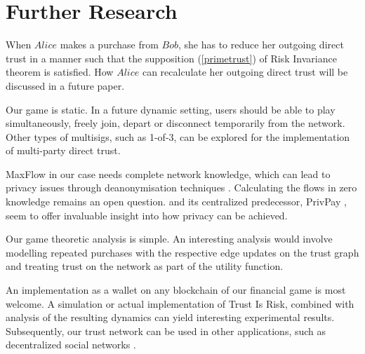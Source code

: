 \section{Further Research}

    When $Alice$ makes a purchase from $Bob$, she has to reduce her outgoing direct trust in a manner such that the
    supposition (\ref{primetrust}) of Risk Invariance theorem is satisfied. How $Alice$ can recalculate her outgoing
    direct trust will be discussed in a future paper.

    Our game is static. In a future dynamic setting, users should be able to play simultaneously, freely join, depart or
    disconnect temporarily from the network. Other types of multisigs, such as 1-of-3, can be explored for the
    implementation of multi-party direct trust.

    MaxFlow in our case needs complete network knowledge, which can lead to privacy issues through deanonymisation
    techniques \cite{deanonymisation}. Calculating the flows in zero knowledge remains an open question.
    \cite{silentwhispers} and its centralized predecessor, PrivPay \cite{privpay}, seem to offer invaluable insight into how
    privacy can be achieved.

    Our game theoretic analysis is simple. An interesting analysis would involve modelling repeated purchases with the
    respective edge updates on the trust graph and treating trust on the network as part of the utility function.

    An implementation as a wallet on any blockchain of our financial game is most welcome. A simulation or actual
    implementation of Trust Is Risk, combined with analysis of the resulting dynamics can yield interesting experimental
    results. Subsequently, our trust network can be used in other applications, such as decentralized social networks
    \cite{synereo}.

